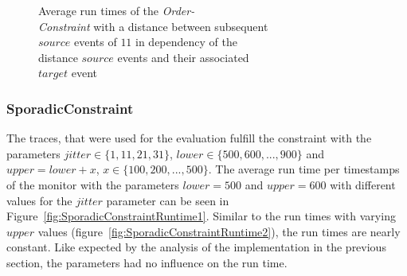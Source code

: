 \begin{figure}
\begin{minipage}{0.45\textwidth}
		\centering
		\caption{Average run times of the \textit{Order-\\Constraint} with a distance between subsequent\\ $source$ events of $11$ in dependency of the\\ distance $source$ events and their associated\\ $target$ event}
		\label{fig:OrderConstraintRunTime2}
	\end{minipage}
\end{figure}

\subsubsection{SporadicConstraint}
The traces, that were used for the evaluation fulfill the constraint with the parameters $jitter\in\{1,11,21,31\}$, $lower\in\{500,600,...,900\}$ and $upper=lower+x$, $x\in\{100, 200, ..., 500\}$. The average run time per timestamps of the monitor with the parameters $lower=500$ and $upper=600$ with different values for the $jitter$ parameter can be seen in Figure~\ref{fig:SporadicConstraintRuntime1}. Similar to the run times with varying $upper$ values (figure~\ref{fig:SporadicConstraintRuntime2}), the run times are nearly constant. Like expected by the analysis of the implementation in the previous section, the parameters had no influence on the run time.

